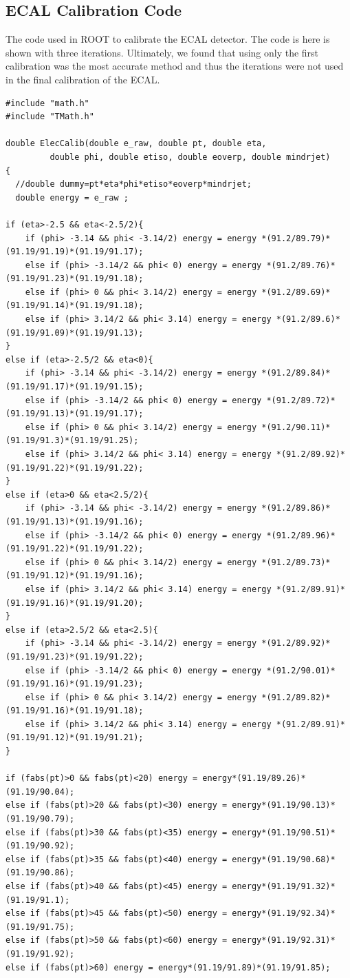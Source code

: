 \documentclass[twocolumn]{article}
\begin{document}
\subsection{ECAL Calibration Code}\label{sec:Code}
The code used in ROOT to calibrate the ECAL detector. The code is here is shown with three iterations. Ultimately, we found that using only the first calibration was the most accurate method and thus the iterations were not used in the final calibration of the ECAL.
\begin{lstlisting}
#include "math.h"
#include "TMath.h"

double ElecCalib(double e_raw, double pt, double eta, 
		 double phi, double etiso, double eoverp, double mindrjet)
{
  //double dummy=pt*eta*phi*etiso*eoverp*mindrjet;
  double energy = e_raw ;
    
if (eta>-2.5 && eta<-2.5/2){
    if (phi> -3.14 && phi< -3.14/2) energy = energy *(91.2/89.79)*(91.19/91.19)*(91.19/91.17);
    else if (phi> -3.14/2 && phi< 0) energy = energy *(91.2/89.76)*(91.19/91.23)*(91.19/91.18);
    else if (phi> 0 && phi< 3.14/2) energy = energy *(91.2/89.69)*(91.19/91.14)*(91.19/91.18);
    else if (phi> 3.14/2 && phi< 3.14) energy = energy *(91.2/89.6)*(91.19/91.09)*(91.19/91.13);
}
else if (eta>-2.5/2 && eta<0){
    if (phi> -3.14 && phi< -3.14/2) energy = energy *(91.2/89.84)*(91.19/91.17)*(91.19/91.15);
    else if (phi> -3.14/2 && phi< 0) energy = energy *(91.2/89.72)*(91.19/91.13)*(91.19/91.17);
    else if (phi> 0 && phi< 3.14/2) energy = energy *(91.2/90.11)*(91.19/91.3)*(91.19/91.25);
    else if (phi> 3.14/2 && phi< 3.14) energy = energy *(91.2/89.92)*(91.19/91.22)*(91.19/91.22);
}
else if (eta>0 && eta<2.5/2){
    if (phi> -3.14 && phi< -3.14/2) energy = energy *(91.2/89.86)*(91.19/91.13)*(91.19/91.16);
    else if (phi> -3.14/2 && phi< 0) energy = energy *(91.2/89.96)*(91.19/91.22)*(91.19/91.22);
    else if (phi> 0 && phi< 3.14/2) energy = energy *(91.2/89.73)*(91.19/91.12)*(91.19/91.16);
    else if (phi> 3.14/2 && phi< 3.14) energy = energy *(91.2/89.91)*(91.19/91.16)*(91.19/91.20);
}
else if (eta>2.5/2 && eta<2.5){
    if (phi> -3.14 && phi< -3.14/2) energy = energy *(91.2/89.92)*(91.19/91.23)*(91.19/91.22);
    else if (phi> -3.14/2 && phi< 0) energy = energy *(91.2/90.01)*(91.19/91.16)*(91.19/91.23);
    else if (phi> 0 && phi< 3.14/2) energy = energy *(91.2/89.82)*(91.19/91.16)*(91.19/91.18);
    else if (phi> 3.14/2 && phi< 3.14) energy = energy *(91.2/89.91)*(91.19/91.12)*(91.19/91.21);
}

if (fabs(pt)>0 && fabs(pt)<20) energy = energy*(91.19/89.26)*(91.19/90.04);
else if (fabs(pt)>20 && fabs(pt)<30) energy = energy*(91.19/90.13)*(91.19/90.79);
else if (fabs(pt)>30 && fabs(pt)<35) energy = energy*(91.19/90.51)*(91.19/90.92);
else if (fabs(pt)>35 && fabs(pt)<40) energy = energy*(91.19/90.68)*(91.19/90.86);
else if (fabs(pt)>40 && fabs(pt)<45) energy = energy*(91.19/91.32)*(91.19/91.1);
else if (fabs(pt)>45 && fabs(pt)<50) energy = energy*(91.19/92.34)*(91.19/91.75);
else if (fabs(pt)>50 && fabs(pt)<60) energy = energy*(91.19/92.31)*(91.19/91.92);
else if (fabs(pt)>60) energy = energy*(91.19/91.89)*(91.19/91.85);


\end{lstlisting}
\end{document}
